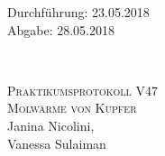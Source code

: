 



\begin{titlepage}
  \begin{flushleft}
 Durchführung: 23.05.2018\\
 Abgabe: 28.05.2018
  \end{flushleft}


\HRule\\[1,0cm]

 \begin{center}


\textsc{\LARGE Praktikumsprotokoll V47}\\[1.5cm]
\textsc{\huge Molwärme von Kupfer} \\[5,5cm]

Janina Nicolini\footnotemark[1], \\
Vanessa Sulaiman\footnotemark[2] \\[1,0cm]



 \end{center}
\HRule

 \vfill

\end{titlepage}






\printbibliography


